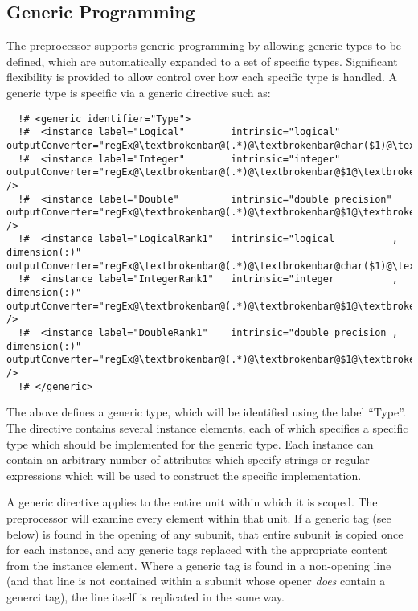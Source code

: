\subsection{Generic Programming}

The preprocessor supports generic programming by allowing generic types to be defined, which are automatically expanded to a set of specific types. Significant flexibility is provided to allow control over how each specific type is handled. A generic type is specific via a {\normalfont \ttfamily generic} directive such as:
\lstset{escapechar=@}
\begin{lstlisting}
  !# <generic identifier="Type">
  !#  <instance label="Logical"        intrinsic="logical"                         outputConverter="regEx@\textbrokenbar@(.*)@\textbrokenbar@char($1)@\textbrokenbar@"/>
  !#  <instance label="Integer"        intrinsic="integer"                         outputConverter="regEx@\textbrokenbar@(.*)@\textbrokenbar@$1@\textbrokenbar@"      />
  !#  <instance label="Double"         intrinsic="double precision"                outputConverter="regEx@\textbrokenbar@(.*)@\textbrokenbar@$1@\textbrokenbar@"      />
  !#  <instance label="LogicalRank1"   intrinsic="logical          , dimension(:)" outputConverter="regEx@\textbrokenbar@(.*)@\textbrokenbar@char($1)@\textbrokenbar@"/>
  !#  <instance label="IntegerRank1"   intrinsic="integer          , dimension(:)" outputConverter="regEx@\textbrokenbar@(.*)@\textbrokenbar@$1@\textbrokenbar@"      />
  !#  <instance label="DoubleRank1"    intrinsic="double precision , dimension(:)" outputConverter="regEx@\textbrokenbar@(.*)@\textbrokenbar@$1@\textbrokenbar@"      />
  !# </generic>
\end{lstlisting}
The above defines a generic type, which will be identified using the label ``{\normalfont \ttfamily Type}''. The directive contains several {\normalfont \ttfamily instance} elements, each of which specifies a specific type which should be implemented for the generic type. Each instance can contain an arbitrary number of attributes which specify strings or regular expressions which will be used to construct the specific implementation.

A generic directive applies to the entire unit within which it is scoped. The preprocessor will examine every element within that unit. If a generic tag (see below) is found in the opening of any subunit, that entire subunit is copied once for each instance, and any generic tags replaced with the appropriate content from the {\normalfont \ttfamily instance} element. Where a generic tag is found in a non-opening line (and that line is not contained within a subunit whose opener \emph{does} contain a generci tag), the line itself is replicated in the same way.


